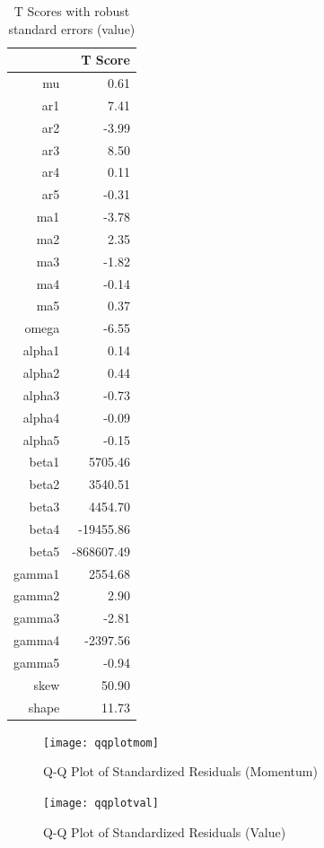 \documentclass[11pt,letterpaper]{memoir}
\begin{document}
\begin{table}[ht]
\centering
\caption{T Scores with robust standard errors (value)}
\begin{tabular}{rr}
  \hline
 & T Score \\ 
  \hline
mu & 0.61 \\ 
  ar1 & 7.41 \\ 
  ar2 & -3.99 \\ 
  ar3 & 8.50 \\ 
  ar4 & 0.11 \\ 
  ar5 & -0.31 \\ 
  ma1 & -3.78 \\ 
  ma2 & 2.35 \\ 
  ma3 & -1.82 \\ 
  ma4 & -0.14 \\ 
  ma5 & 0.37 \\ 
  omega & -6.55 \\ 
  alpha1 & 0.14 \\ 
  alpha2 & 0.44 \\ 
  alpha3 & -0.73 \\ 
  alpha4 & -0.09 \\ 
  alpha5 & -0.15 \\ 
  beta1 & 5705.46 \\ 
  beta2 & 3540.51 \\ 
  beta3 & 4454.70 \\ 
  beta4 & -19455.86 \\ 
  beta5 & -868607.49 \\ 
  gamma1 & 2554.68 \\ 
  gamma2 & 2.90 \\ 
  gamma3 & -2.81 \\ 
  gamma4 & -2397.56 \\ 
  gamma5 & -0.94 \\ 
  skew & 50.90 \\ 
  shape & 11.73 \\ 
   \hline
\end{tabular}
\end{table}
\begin{figure}
\texttt{[image: qqplotmom]}
\caption{Q-Q Plot of Standardized Residuals (Momentum)}
\end{figure}
\begin{figure}
\texttt{[image: qqplotval]}
\caption{Q-Q Plot of Standardized Residuals (Value)}
\end{figure}
\end{document}
